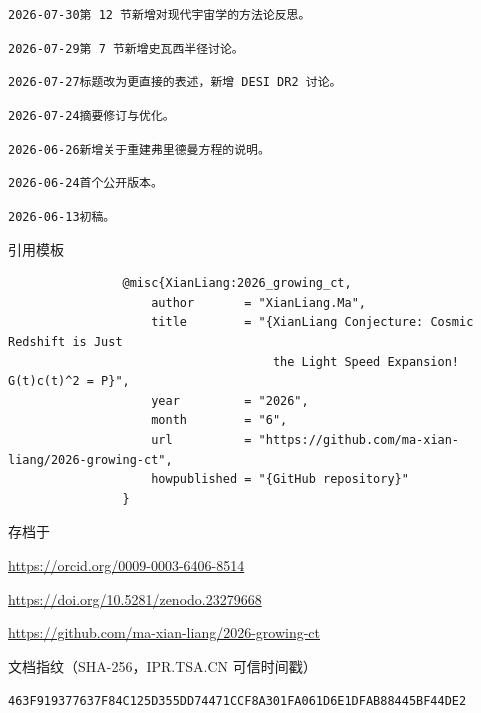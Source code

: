 \documentclass[12pt,leqno]{article}
\begin{document}
\begin{footnotesize}
		\vspace{0.1em}
		\texttt{2026-07-30\hspace{1.2em}第 12 节新增对现代宇宙学的方法论反思。}
		
		\vspace{0.1em}
		\texttt{2026-07-29\hspace{1.2em}第 7 节新增史瓦西半径讨论。}
				
		\vspace{0.1em}
		\texttt{2026-07-27\hspace{1.2em}标题改为更直接的表述，新增 DESI DR2 讨论。}
		
		\vspace{0.1em}
		\texttt{2026-07-24\hspace{1.2em}摘要修订与优化。}
		
		\vspace{0.1em}
		\texttt{2026-06-26\hspace{1.2em}新增关于重建弗里德曼方程的说明。}
		
		\vspace{0.1em}
		\texttt{2026-06-24\hspace{1.2em}首个公开版本。}
		
		\vspace{0.1em}
		\texttt{2026-06-13\hspace{1.2em}初稿。}
				
		\vskip 0.2in
		\noindent
		引用模板
				
		\smallskip
		\hspace{-0.8em} \begin{minipage}{\linewidth}
			\begin{verbatim}
				@misc{XianLiang:2026_growing_ct,
					author       = "XianLiang.Ma",
					title        = "{XianLiang Conjecture: Cosmic Redshift is Just 
					                 the Light Speed Expansion! G(t)c(t)^2 = P}",
					year         = "2026",
					month        = "6",
					url          = "https://github.com/ma-xian-liang/2026-growing-ct",
					howpublished = "{GitHub repository}"
				}
			\end{verbatim}
		\end{minipage}
		
		
		\vskip 0.1in
		\noindent
		存档于
		
		\smallskip
		\url{https://orcid.org/0009-0003-6406-8514}
		
		\smallskip
		\url{https://doi.org/10.5281/zenodo.23279668} 
		
		\smallskip
		\url{https://github.com/ma-xian-liang/2026-growing-ct}
		
		\vskip 0.2in
		\noindent
		文档指纹（SHA-256，IPR.TSA.CN 可信时间戳）
		
		\smallskip
		\texttt{463F919377637F84C125D355DD74471CCF8A301FA061D6E1DFAB88445BF44DE2}		
	\end{footnotesize}
		
\end{document}
